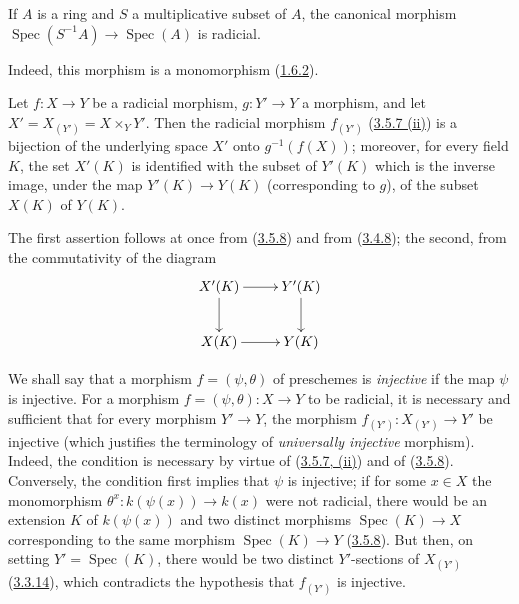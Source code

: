 \begin{corollary}[3.5.9]
\label{I.3.5.9}
If $A$ is a ring and $S$ a multiplicative subset of $A$, the canonical
morphism $\operatorname{Spec}(S^{-1}A)\to\operatorname{Spec}(A)$ is
radicial.
\end{corollary}

Indeed, this morphism is a monomorphism
(\hyperref[I.1.6.2]{1.6.2}).

\begin{corollary}[3.5.10]
\label{I.3.5.10}
Let $f:X\to Y$ be a radicial morphism, $g:Y'\to Y$ a morphism, and let
$X'=X_{(Y')}=X\times_Y Y'$. Then the radicial morphism $f_{(Y')}$
(\hyperref[I.3.5.7]{3.5.7 (ii)}) is a bijection of the underlying space
$X'$ onto $g^{-1}(f(X))$; moreover, for every field $K$, the set $X'(K)$
is identified with the subset of $Y'(K)$ which is the inverse image, under the
map $Y'(K)\to Y(K)$ (corresponding to $g$), of the subset $X(K)$ of $Y(K)$.
\end{corollary}

The first assertion follows at once from
(\hyperref[I.3.5.8]{3.5.8}) and from
(\hyperref[I.3.4.8]{3.4.8}); the second, from the commutativity of the
diagram
\label{I.3.5.10.base-change-points-diagram}
\[
  \xymatrix{
    X'(K)\ar[r]\ar[d] & Y'(K)\ar[d]\\
    X(K)\ar[r] & Y(K)
  }
\]

\begin{remark}[3.5.11]
\label{I.3.5.11}
We shall say that a morphism $f=(\psi,\theta)$ of preschemes is
\emph{injective} if the map $\psi$ is injective. For a morphism
$f=(\psi,\theta):X\to Y$ to be radicial, it is necessary and sufficient that
for every morphism $Y'\to Y$, the morphism $f_{(Y')}:X_{(Y')}\to Y'$ be
injective (which justifies the terminology of \emph{universally injective}
morphism). Indeed, the condition is necessary by virtue of
(\hyperref[I.3.5.7]{3.5.7, (ii)}) and of
(\hyperref[I.3.5.8]{3.5.8}). Conversely, the condition first implies that
$\psi$ is injective; if for some $x\in X$ the monomorphism
$\theta^x:k(\psi(x))\to k(x)$ were not radicial, there would be an extension
$K$ of $k(\psi(x))$ and two distinct morphisms
$\operatorname{Spec}(K)\to X$ corresponding to the same morphism
$\operatorname{Spec}(K)\to Y$ (\hyperref[I.3.5.8]{3.5.8}). But then, on
setting $Y'=\operatorname{Spec}(K)$, there would be two distinct $Y'$-sections
of $X_{(Y')}$ (\hyperref[I.3.3.14]{3.3.14}), which contradicts the
hypothesis that $f_{(Y')}$ is injective.
\end{remark}

